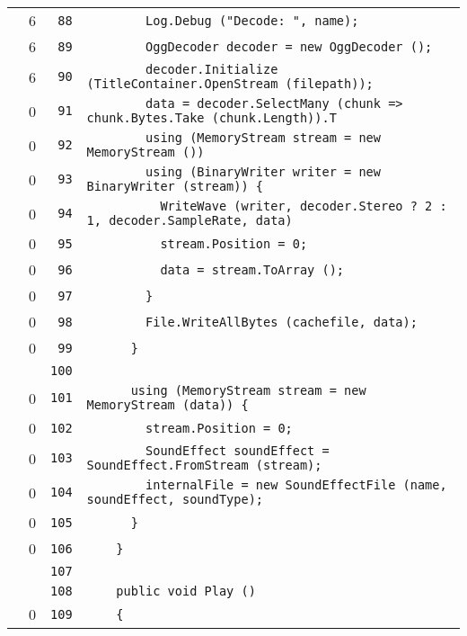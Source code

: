 \documentclass[a4paper,10pt]{article}
\begin{document}
\begin{longtable}[l]{lrrl}
\cellcolor{green} & 6 & \verb~88~ & \verb~        Log.Debug ("Decode: ", name);~\\
\cellcolor{green} & 6 & \verb~89~ & \verb~        OggDecoder decoder = new OggDecoder ();~\\
\cellcolor{green} & 6 & \verb~90~ & \verb~        decoder.Initialize (TitleContainer.OpenStream (filepath));~\\
\cellcolor{red} & 0 & \verb~91~ & \verb~        data = decoder.SelectMany (chunk => chunk.Bytes.Take (chunk.Length)).T~\\
\cellcolor{red} & 0 & \verb~92~ & \verb~        using (MemoryStream stream = new MemoryStream ())~\\
\cellcolor{red} & 0 & \verb~93~ & \verb~        using (BinaryWriter writer = new BinaryWriter (stream)) {~\\
\cellcolor{red} & 0 & \verb~94~ & \verb~          WriteWave (writer, decoder.Stereo ? 2 : 1, decoder.SampleRate, data)~\\
\cellcolor{red} & 0 & \verb~95~ & \verb~          stream.Position = 0;~\\
\cellcolor{red} & 0 & \verb~96~ & \verb~          data = stream.ToArray ();~\\
\cellcolor{red} & 0 & \verb~97~ & \verb~        }~\\
\cellcolor{red} & 0 & \verb~98~ & \verb~        File.WriteAllBytes (cachefile, data);~\\
\cellcolor{red} & 0 & \verb~99~ & \verb~      }~\\
\cellcolor{gray} &  & \verb~100~ & \verb~~\\
\cellcolor{red} & 0 & \verb~101~ & \verb~      using (MemoryStream stream = new MemoryStream (data)) {~\\
\cellcolor{red} & 0 & \verb~102~ & \verb~        stream.Position = 0;~\\
\cellcolor{red} & 0 & \verb~103~ & \verb~        SoundEffect soundEffect = SoundEffect.FromStream (stream);~\\
\cellcolor{red} & 0 & \verb~104~ & \verb~        internalFile = new SoundEffectFile (name, soundEffect, soundType);~\\
\cellcolor{red} & 0 & \verb~105~ & \verb~      }~\\
\cellcolor{red} & 0 & \verb~106~ & \verb~    }~\\
\cellcolor{gray} &  & \verb~107~ & \verb~~\\
\cellcolor{gray} &  & \verb~108~ & \verb~    public void Play ()~\\
\cellcolor{red} & 0 & \verb~109~ & \verb~    {~\\

\end{longtable}
\end{document}
